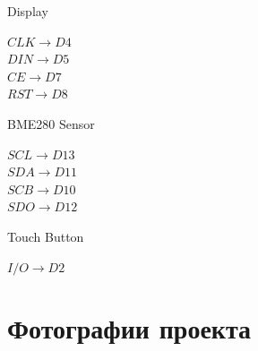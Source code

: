 \documentclass[12pt]{article}
\begin{document}
    \begin{minipage}{0.33\textwidth}
      \begin{flushleft}
        Display

        \vspace{0.3cm}

        $CLK \rightarrow D4$\\
        $DIN \rightarrow D5$\\
        $CE \rightarrow D7$\\
        $RST \rightarrow D8$\\

      \end{flushleft}
    \end{minipage}
    \begin{minipage}{0.33\textwidth}
      \begin{flushleft}
        BME280 Sensor

        \vspace{0.3cm}

        $SCL \rightarrow D13$\\
        $SDA \rightarrow D11$\\
        $SCB \rightarrow D10$\\
        $SDO \rightarrow D12$\\

      \end{flushleft}
    \end{minipage}
    \begin{minipage}{0.33\textwidth}
      \begin{flushleft}
        Touch Button

        \vspace{0.3cm}

        $I/O \rightarrow D2$

      \end{flushleft}
    \end{minipage}

  \newpage
  \section{Фотографии проекта}
\end{document}
